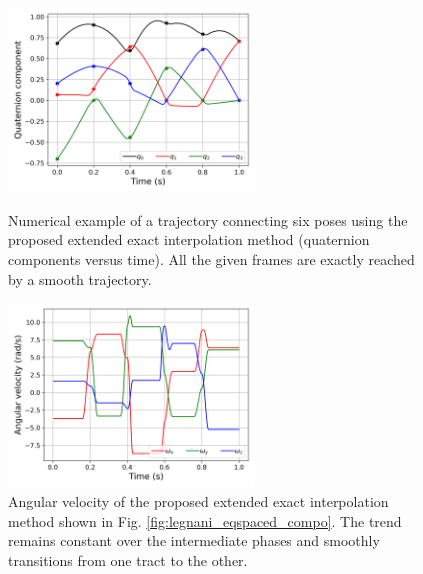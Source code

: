 \begin{figure}[tbp]
    \begin{minipage}[t]{0.49\textwidth}
        \centering
        \includegraphics[width=6.5cm]{figures/legnani_eqspaced_compo.png}
        \caption{Numerical example of a trajectory connecting six poses using the proposed extended exact interpolation method (quaternion components versus time). All the given frames are exactly reached by a smooth trajectory.}
        \label{fig:legnani_eqspaced_compo}
    \end{minipage}
    \hfill
    \begin{minipage}[t]{0.49\textwidth}
        \centering
        \includegraphics[width=6.5cm]{figures/legnani_eqspaced_vel.png}
        \caption{Angular velocity of the proposed extended exact interpolation method shown in Fig. \ref{fig:legnani_eqspaced_compo}. The trend remains constant over the intermediate phases and smoothly transitions from one tract to the other.}
        \label{fig:legnani_eqspaced_vel}
    \end{minipage}
\end{figure}

